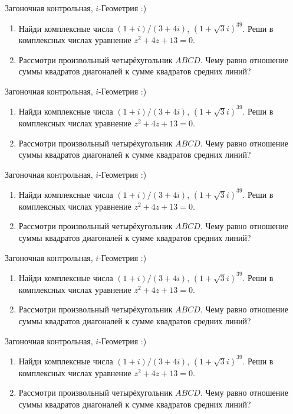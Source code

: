\documentclass[12pt,a4paper]{article}
\begin{document}
Загоночная контрольная, $i$-Геометрия :)

\begin{enumerate}
\item Найди комплексные числа  $(1+i)/(3+4i)$, $(1+\sqrt{3}i)^{39}$. Реши в комплексных числах уравнение $z^2+4z+13=0$.
\item Рассмотри произвольный четырёхугольник $ABCD$. Чему равно отношение суммы квадратов диагоналей к сумме квадратов средних линий?
\end{enumerate}


Загоночная контрольная, $i$-Геометрия :)

\begin{enumerate}
\item Найди комплексные числа  $(1+i)/(3+4i)$, $(1+\sqrt{3}i)^{39}$. Реши в комплексных числах уравнение $z^2+4z+13=0$.
\item Рассмотри произвольный четырёхугольник $ABCD$. Чему равно отношение суммы квадратов диагоналей к сумме квадратов средних линий?
\end{enumerate}

Загоночная контрольная, $i$-Геометрия :)

\begin{enumerate}
\item Найди комплексные числа  $(1+i)/(3+4i)$, $(1+\sqrt{3}i)^{39}$. Реши в комплексных числах уравнение $z^2+4z+13=0$.
\item Рассмотри произвольный четырёхугольник $ABCD$. Чему равно отношение суммы квадратов диагоналей к сумме квадратов средних линий?
\end{enumerate}


Загоночная контрольная, $i$-Геометрия :)

\begin{enumerate}
\item Найди комплексные числа  $(1+i)/(3+4i)$, $(1+\sqrt{3}i)^{39}$. Реши в комплексных числах уравнение $z^2+4z+13=0$.
\item Рассмотри произвольный четырёхугольник $ABCD$. Чему равно отношение суммы квадратов диагоналей к сумме квадратов средних линий?
\end{enumerate}

Загоночная контрольная, $i$-Геометрия :)

\begin{enumerate}
\item Найди комплексные числа  $(1+i)/(3+4i)$, $(1+\sqrt{3}i)^{39}$. Реши в комплексных числах уравнение $z^2+4z+13=0$.
\item Рассмотри произвольный четырёхугольник $ABCD$. Чему равно отношение суммы квадратов диагоналей к сумме квадратов средних линий?
\end{enumerate}
\end{document}
